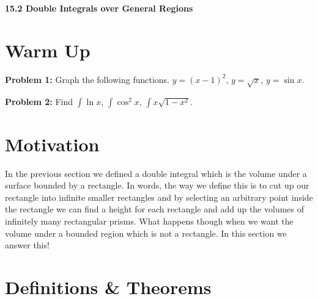 \documentclass[11pt]{article}
\newcommand{\vs}{\vspace*{.1in}}
\begin{document}
\begin{LARGE}\begin{center}\bf 15.2 Double Integrals over General Regions\end{center}
\end{LARGE}

\vs\vs



\section{Warm Up}
\textbf{Problem 1:} Graph the following functions. $y = (x-1)^2$, $y = \sqrt{x}$, $y = \sin{x}$.

\textbf{Problem 2:} Find $\int \ln{x}$, $\int \cos^2{x}$, $\int x\sqrt{1 - x^2}$.

\section{Motivation}
In the previous section we defined a double integral which is the volume under a surface bounded by a rectangle. In words, the way we define this is to cut up our rectangle into infinite smaller rectangles and by selecting an arbitrary point inside the rectangle we can find a height for each rectangle and add up the volumes of infinitely many rectangular prisms. What happens though when we want the volume under a bounded region which is not a rectangle. In this section we answer this!


\section{Definitions \& Theorems}
\end{document}
